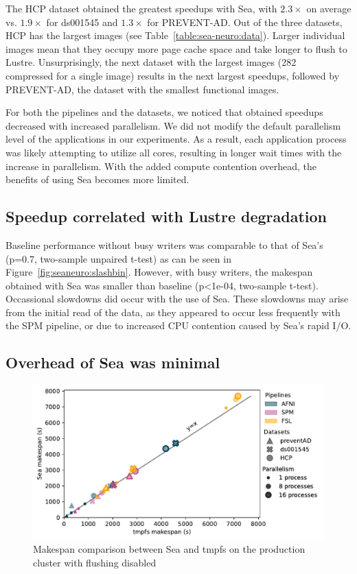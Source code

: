 \documentclass[fleqn,10pt]{wlscirep}
\begin{document}
The HCP dataset obtained the greatest speedups with
Sea, with $2.3\times$ on average vs. $1.9\times$ for ds001545  and $1.3\times$ for PREVENT-AD.
Out of the three datasets, HCP has the largest images (see
Table~\ref{table:sea-neuro:data}). Larger individual images mean that they
occupy more page cache space and take longer to flush to Lustre. Unsurprisingly,
the next dataset with the largest images (\SI{282}{\mebi\byte} compressed for a
single image) results in the next largest speedups, followed by PREVENT-AD, the
dataset with the smallest functional images.

For both the pipelines and the datasets, we noticed that obtained speedups
decreased with increased parallelism. We did not modify the default parallelism
level of the applications in our experiments. As a result, each application
process was likely attempting to utilize all cores, resulting in longer wait times
with the increase in parallelism. With the added compute contention overhead, the benefits of using
Sea becomes more limited.


\subsection{Speedup correlated with Lustre degradation}

Baseline performance without busy writers was comparable to that of Sea's (p=0.7, two-sample unpaired t-test) as can be seen in Figure~\ref{fig:seaneuro:slashbin}. However, with
busy writers, the makespan obtained with Sea was smaller than baseline (p<1e-04, two-sample t-test). Occassional slowdowns did occur with the use of Sea. These slowdowns
may arise from the initial read of the data, as they appeared to occur less
frequently with the SPM pipeline, or due to increased CPU contention caused by Sea's rapid I/O.



\subsection{Overhead of Sea was minimal}


\begin{figure}
\centering
\includegraphics[width=0.7\columnwidth]{figures/beluga_sea_tmpfs.pdf}%
\caption{Makespan comparison between Sea and tmpfs on the production cluster with flushing disabled}
\label{fig:seaneuro:tmpfs}
\end{figure}
\end{document}
